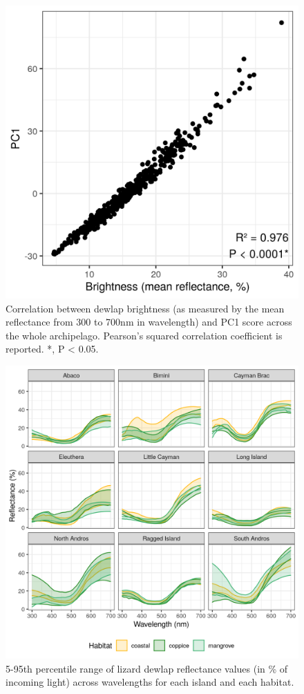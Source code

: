 \begin{figure}
	\centering
	\includegraphics{"../analyses/03-PCA/figure_brightness_pooled"}
	\caption{Correlation between dewlap brightness (as measured by the mean reflectance from 300 to 700nm in wavelength) and PC1 score across the whole archipelago. Pearson's squared correlation coefficient is reported. *, P < 0.05.}
	\label{supfig:brightness_pooled}
\end{figure}

\begin{figure}[H]
	\centering
	\includegraphics[width=\textwidth]{"../analyses/02-reflectance/figure_reflectance"}
	\caption{5-95th percentile range of lizard dewlap reflectance values (in \% of incoming light) across wavelengths for each island and each habitat.}
	\label{supfig:reflectance}
\end{figure}

